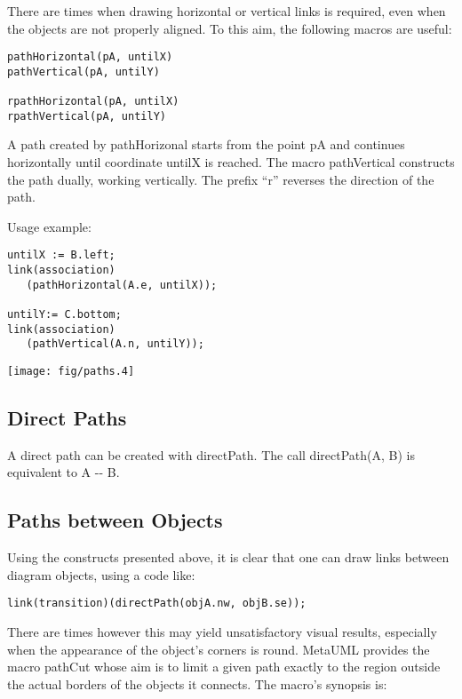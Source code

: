 \documentclass{article}
\newcommand{\code}{\ttfamily}
\begin{document}
There are times when drawing horizontal or vertical links is required,
even when the objects are not properly aligned. To this aim, the following macros
are useful:

\begin{verbatim}
pathHorizontal(pA, untilX)
pathVertical(pA, untilY)

rpathHorizontal(pA, untilX)
rpathVertical(pA, untilY)
\end{verbatim}

A path created by {\code pathHorizonal} starts from the point {\code pA}
and continues horizontally until coordinate {\code untilX} is reached. The macro
{\code pathVertical} constructs the path dually, working vertically.
The prefix ``{\code r}'' reverses the direction of the path.

Usage example:

\begin{multicols}{2}
\begin{verbatim}
untilX := B.left;
link(association)
   (pathHorizontal(A.e, untilX));

untilY:= C.bottom;
link(association)
   (pathVertical(A.n, untilY));
\end{verbatim}
\columnbreak
\hspace{1cm}\texttt{[image: fig/paths.4]}
\end{multicols}

\subsection{Direct Paths}

A direct path can be created with {\code directPath}. The call {\code directPath(A, B)}
is equivalent to {\code A -{}-  B}.

\subsection{Paths between Objects}

Using the constructs presented above, it is clear that one can draw links between diagram
objects, using a code like:

\begin{verbatim}
link(transition)(directPath(objA.nw, objB.se));
\end{verbatim}

There are times however this may yield unsatisfactory visual results,
especially when the appearance of the object's corners is round. MetaUML provides the macro
{\code pathCut} whose aim is to limit a given path exactly to the region outside the actual
borders of the objects it connects. The macro's synopsis is:
\end{document}
